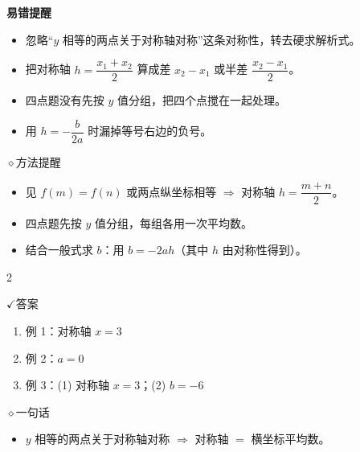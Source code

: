 \documentclass{exam-zh}
\newcommand{\eduSubTitle}[1]{%
  \needspace{4\baselineskip}%
  \vspace{1mm}
  {\color{edu-blue}\bfseries #1}\par
  \vspace{1mm}
}
\newcommand{\eduIconCheck}{\(\checkmark\)}
\newcommand{\eduIconPin}{\(\diamond\)}
\newenvironment{eduBulletList}{%
  \begin{itemize}[
    label=\textbullet,
    leftmargin=5mm,
    itemsep=1.2mm,
    topsep=0pt,
    parsep=0pt
  ]
}{%
  \end{itemize}
}
\newenvironment{eduBottomGrid}{%
  \columnratio{0.32, 0.68}%
  \setlength{\columnsep}{11mm}%
  \columnseprule=0pt%
  \begin{paracol}{2}%
}{%
  \end{paracol}%
}
\newenvironment{eduSummaryLeft}{%
}{%
}
\newcommand{\eduSummaryDivider}{%
  \switchcolumn
}
\newenvironment{eduSummaryRight}{%
}{%
}
\newenvironment{eduPlainList}{%
  \begin{enumerate}[
    label=(\arabic*),
    leftmargin=7mm,
    itemsep=1.2mm,
    topsep=0pt,
    parsep=0pt
  ]
}{%
  \end{enumerate}
}
\begin{document}
\begin{eduMistakeBox}
\eduSubTitle{易错提醒}\begin{itemize}
  \item 忽略“$y$ 相等的两点关于对称轴对称”这条对称性，转去硬求解析式。
  \item 把对称轴 $h=\dfrac{x_1+x_2}{2}$ 算成差 $x_2-x_1$ 或半差 $\dfrac{x_2-x_1}{2}$。
  \item 四点题没有先按 $y$ 值分组，把四个点搅在一起处理。
  \item 用 $h=-\dfrac{b}{2a}$ 时漏掉等号右边的负号。
\end{itemize}
\end{eduMistakeBox}




\begin{eduSummaryBlock}{\eduIconPin}{方法提醒}
\begin{eduBulletList}
  \item 见 $f(m)=f(n)$ 或两点纵坐标相等 $\Rightarrow$ 对称轴 $h=\dfrac{m+n}{2}$。  \item 四点题先按 $y$ 值分组，每组各用一次平均数。  \item 结合一般式求 $b$：用 $b=-2ah$（其中 $h$ 由对称性得到）。\end{eduBulletList}
\end{eduSummaryBlock}




\begin{eduBottomGrid}
  \begin{eduSummaryLeft}
    \begin{eduSummaryBlock}{\eduIconCheck}{答案}
    \begin{eduPlainList}
      \item 例 1：对称轴 $x=3$      \item 例 2：$a=0$      \item 例 3：(1) 对称轴 $x=3$；(2) $b=-6$    \end{eduPlainList}
    \end{eduSummaryBlock}
  \end{eduSummaryLeft}
  \eduSummaryDivider
  \begin{eduSummaryRight}
    \begin{eduSummaryBlock}{\eduIconPin}{一句话}
    \begin{eduBulletList}
      \item $y$ 相等的两点关于对称轴对称 $\Rightarrow$ 对称轴 $=$ 横坐标平均数。    \end{eduBulletList}
    \end{eduSummaryBlock}
  \end{eduSummaryRight}
\end{eduBottomGrid}
\end{document}
